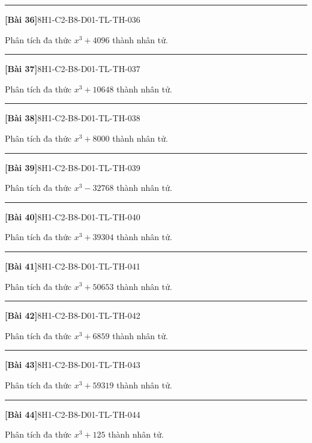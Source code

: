 \documentclass[12pt,a4paper]{article}
\newif\ifloigiai
\newenvironment{cauhoi}[2]{%
  \par\medskip\noindent\rule{\textwidth}{0.4pt}\par\nopagebreak
  \noindent\textbf{[#1]}\hfill{\scriptsize\ttfamily #2}\par\nopagebreak\smallskip}{\par}
\newcommand{\loigiai}[1]{\ifloigiai\par\smallskip\noindent\textit{Lời giải.} #1\par\fi}
\begin{document}
\begin{cauhoi}{Bài 36}{8H1-C2-B8-D01-TL-TH-036}
Phân tích đa thức $x^{3}+4096$ thành nhân tử.
\loigiai{Áp dụng hằng đẳng thức $a^{3}+b^{3}=(a+b)(a^{2}-ab+b^{2})$ với $b=16$: $x^{3}+4096=(x+16)(x^{2}-16x+256)$.}
\end{cauhoi}
\begin{cauhoi}{Bài 37}{8H1-C2-B8-D01-TL-TH-037}
Phân tích đa thức $x^{3}+10648$ thành nhân tử.
\loigiai{Áp dụng hằng đẳng thức $a^{3}+b^{3}=(a+b)(a^{2}-ab+b^{2})$ với $b=22$: $x^{3}+10648=(x+22)(x^{2}-22x+484)$.}
\end{cauhoi}
\begin{cauhoi}{Bài 38}{8H1-C2-B8-D01-TL-TH-038}
Phân tích đa thức $x^{3}+8000$ thành nhân tử.
\loigiai{Áp dụng hằng đẳng thức $a^{3}+b^{3}=(a+b)(a^{2}-ab+b^{2})$ với $b=20$: $x^{3}+8000=(x+20)(x^{2}-20x+400)$.}
\end{cauhoi}
\begin{cauhoi}{Bài 39}{8H1-C2-B8-D01-TL-TH-039}
Phân tích đa thức $x^{3}-32768$ thành nhân tử.
\loigiai{Áp dụng hằng đẳng thức $a^{3}-b^{3}=(a-b)(a^{2}+ab+b^{2})$ với $b=32$: $x^{3}-32768=(x-32)(x^{2}+32x+1024)$.}
\end{cauhoi}
\begin{cauhoi}{Bài 40}{8H1-C2-B8-D01-TL-TH-040}
Phân tích đa thức $x^{3}+39304$ thành nhân tử.
\loigiai{Áp dụng hằng đẳng thức $a^{3}+b^{3}=(a+b)(a^{2}-ab+b^{2})$ với $b=34$: $x^{3}+39304=(x+34)(x^{2}-34x+1156)$.}
\end{cauhoi}
\begin{cauhoi}{Bài 41}{8H1-C2-B8-D01-TL-TH-041}
Phân tích đa thức $x^{3}+50653$ thành nhân tử.
\loigiai{Áp dụng hằng đẳng thức $a^{3}+b^{3}=(a+b)(a^{2}-ab+b^{2})$ với $b=37$: $x^{3}+50653=(x+37)(x^{2}-37x+1369)$.}
\end{cauhoi}
\begin{cauhoi}{Bài 42}{8H1-C2-B8-D01-TL-TH-042}
Phân tích đa thức $x^{3}+6859$ thành nhân tử.
\loigiai{Áp dụng hằng đẳng thức $a^{3}+b^{3}=(a+b)(a^{2}-ab+b^{2})$ với $b=19$: $x^{3}+6859=(x+19)(x^{2}-19x+361)$.}
\end{cauhoi}
\begin{cauhoi}{Bài 43}{8H1-C2-B8-D01-TL-TH-043}
Phân tích đa thức $x^{3}+59319$ thành nhân tử.
\loigiai{Áp dụng hằng đẳng thức $a^{3}+b^{3}=(a+b)(a^{2}-ab+b^{2})$ với $b=39$: $x^{3}+59319=(x+39)(x^{2}-39x+1521)$.}
\end{cauhoi}
\begin{cauhoi}{Bài 44}{8H1-C2-B8-D01-TL-TH-044}
Phân tích đa thức $x^{3}+125$ thành nhân tử.
\loigiai{Áp dụng hằng đẳng thức $a^{3}+b^{3}=(a+b)(a^{2}-ab+b^{2})$ với $b=5$: $x^{3}+125=(x+5)(x^{2}-5x+25)$.}
\end{cauhoi}
\end{document}
